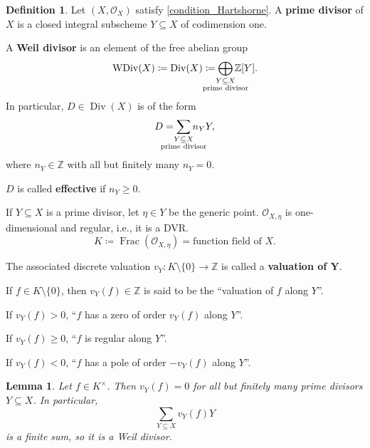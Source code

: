 \documentclass[12pt]{article}
\DeclareMathOperator{\Frac}{Frac}
\DeclareMathOperator{\WDiv}{WDiv}
\DeclareMathOperator{\Div}{Div}
\newtheorem*{lemma}{Lemma}
\theoremstyle{definition}
\newtheorem*{definition}{Definition}
\begin{document}
\begin{definition}
Let $(X,\mathcal{O}_X)$ satisfy \eqref{condition_Hartshorne}. A \textbf{prime divisor} of $X$ is a closed integral subscheme $Y\subseteq X$ of codimension one.

A \textbf{Weil divisor} is an element of the free abelian group
\[\WDiv(X)\coloneqq\Div(X)\coloneqq\bigoplus_{\mathclap{\substack{Y\subseteq X\\\text{prime divisor}}}}\mathbb{Z}[Y].\]
In particular, $D\in\Div(X)$ is of the form
\[D=\sum_{\mathclap{\substack{Y\subseteq X\\\text{prime divisor}}}}n_YY,\]
where $n_Y\in\mathbb{Z}$ with all but finitely many $n_Y=0$.

$D$ is called \textbf{effective} if $n_Y\geq0$.

If $Y\subseteq X$ is a prime divisor, let $\eta\in Y$ be the generic point. $\mathcal{O}_{X,\eta}$ is one-dimensional and regular, i.e., it is a DVR.
\[K\coloneqq\Frac(\mathcal{O}_{X,\eta})=\text{function field of }X.\]

The associated discrete valuation $v_Y:K\setminus\{0\}\rightarrow\mathbb{Z}$ is called a \textbf{valuation of $\boldsymbol{Y}$}.

If $f\in K\setminus\{0\}$, then $v_Y(f)\in\mathbb{Z}$ is said to be the ``valuation of $f$ along $Y$''.

If $v_Y(f)>0$, ``$f$ has a zero of order $v_Y(f)$ along $Y$''.

If $v_Y(f)\geq0$, ``$f$ is regular along $Y$''.

If $v_Y(f)<0$, ``$f$ has a pole of order $-v_Y(f)$ along $Y$''.
\end{definition}

\begin{lemma}
Let $f\in K^{\times}$. Then $v_Y(f)=0$ for all but finitely many prime divisors $Y\subseteq X$. In particular,
\[\sum_{Y\subseteq X}v_Y(f)Y\]
is a finite sum, so it is a Weil divisor.
\end{lemma}
\end{document}

